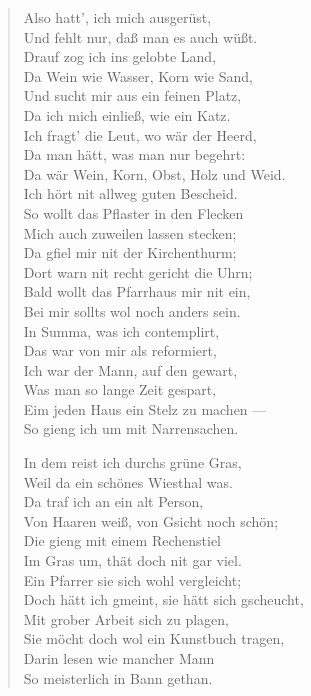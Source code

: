 \begin{verse}
Also hatt’, ich mich ausgerüst,\\
Und fehlt nur, daß man es auch wüßt.\\
Drauf zog ich ins gelobte Land,\\
Da Wein wie Wasser, Korn wie Sand,\\
Und sucht mir aus ein feinen Platz,\\
Da ich mich einließ, wie ein Katz.\\
Ich fragt’ die Leut, wo wär der Heerd,\\
Da man hätt, was man nur begehrt:\\
Da wär Wein, Korn, Obst, Holz und Weid.\\
Ich hört nit allweg guten Bescheid.\\
So wollt das Pflaster in den Flecken\\
Mich auch zuweilen lassen stecken;\\
Da gfiel mir nit der Kirchenthurm;\\
Dort warn nit recht gericht die Uhrn;\\
Bald wollt das Pfarrhaus mir nit ein,\\
Bei mir sollts wol noch anders sein.\\
In Summa, was ich contemplirt,\\
Das war von mir als reformiert,\\
Ich war der Mann, auf den gewart,\\
Was man so lange Zeit gespart,\\
Eim jeden Haus ein Stelz zu machen —\\
So gieng ich um mit Narrensachen.

In dem reist ich durchs grüne Gras,\\
Weil da ein schönes Wiesthal was.\\
Da traf ich an ein alt Person,\\
Von Haaren weiß, von Gsicht noch schön;\\
Die gieng mit einem Rechenstiel\\
Im Gras um, thät doch nit gar viel.\\
Ein Pfarrer sie sich wohl vergleicht;\\
Doch hätt ich gmeint, sie hätt sich gscheucht,\\
Mit grober Arbeit sich zu plagen,\\
Sie möcht doch wol ein Kunstbuch tragen,\\
Darin lesen wie mancher Mann\\
So meisterlich in Bann gethan.


\end{verse}
